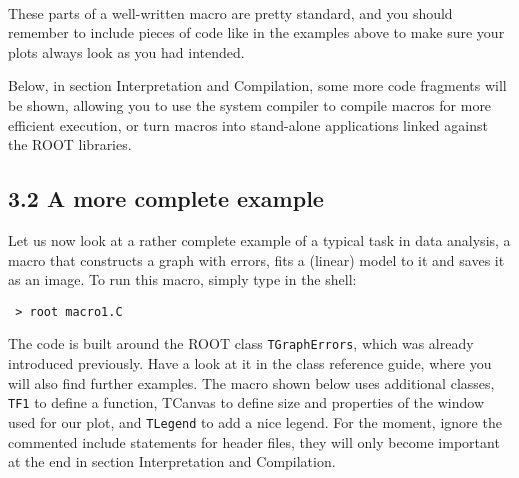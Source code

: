 \documentclass{article}
\begin{document}
    \begin{center}
    \end{center}
    { \hspace*{\fill} \\}
    
    These parts of a well-written macro are pretty standard, and you should
remember to include pieces of code like in the examples above to make
sure your plots always look as you had intended.

Below, in section Interpretation and Compilation, some more code
fragments will be shown, allowing you to use the system compiler to
compile macros for more efficient execution, or turn macros into
stand-alone applications linked against the ROOT libraries.

\subsection{3.2 A more complete example}\label{a-more-complete-example}

Let us now look at a rather complete example of a typical task in data
analysis, a macro that constructs a graph with errors, fits a (linear)
model to it and saves it as an image. To run this macro, simply type in
the shell:

\begin{verbatim}
 > root macro1.C
\end{verbatim}

The code is built around the ROOT class \texttt{TGraphErrors}, which was
already introduced previously. Have a look at it in the class reference
guide, where you will also find further examples. The macro shown below
uses additional classes, \texttt{TF1} to define a function, TCanvas to
define size and properties of the window used for our plot, and
\texttt{TLegend} to add a nice legend. For the moment, ignore the
commented include statements for header files, they will only become
important at the end in section Interpretation and Compilation.
\end{document}
